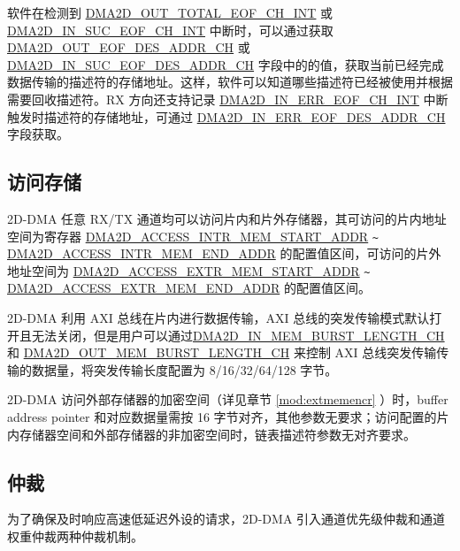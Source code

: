 \documentclass[main\_\_CN.tex]{subfiles}
\begin{document}
软件在检测到 \hyperref[int:DMA2DOUTTOTALEOFINT]{DMA2D\_OUT\_TOTAL\_EOF\_CH\_INT} 或 \hyperref[int:DMA2DINSUCEOFINT]{DMA2D\_IN\_SUC\_EOF\_CH\_INT} 中断时，可以通过获取 \hyperref[fielddesc:DMA2DOUTEOFDESADDRCHN]{DMA2D\_OUT\_EOF\_DES\_ADDR\_CH} 或 \hyperref[fielddesc:DMA2DINSUCEOFDESADDRCHN]{DMA2D\_IN\_SUC\_EOF\_DES\_ADDR\_CH} 字段中的的值，获取当前已经完成数据传输的描述符的存储地址。这样，软件可以知道哪些描述符已经被使用并根据需要回收描述符。RX 方向还支持记录 \hyperref[int:DMA2DINERREOFINT]{DMA2D\_IN\_ERR\_EOF\_CH\_INT} 中断触发时描述符的存储地址，可通过 \hyperref[fielddesc:DMA2DINERREOFDESADDRCHN]{DMA2D\_IN\_ERR\_EOF\_DES\_ADDR\_CH} 字段获取。


\subsection{访问存储}\label{sec:dma2d-access-ram}
2D-DMA 任意 RX/TX 通道均可以访问片内和片外存储器，其可访问的片内地址空间为寄存器 \hyperref[fielddesc:DMA2DACCESSINTRMEMSTARTADDR]{DMA2D\_ACCESS\_INTR\_MEM\_START\_ADDR} \verb+~+ \hyperref[fielddesc:DMA2DACCESSINTRMEMENDADDR]{DMA2D\_ACCESS\_INTR\_MEM\_END\_ADDR} 的配置值区间，可访问的片外地址空间为 \hyperref[fielddesc:DMA2DACCESSEXTRMEMSTARTADDR]{DMA2D\_ACCESS\_EXTR\_MEM\_START\_ADDR} \verb+~+ \hyperref[fielddesc:DMA2DACCESSEXTRMEMENDADDR]{DMA2D\_ACCESS\_EXTR\_MEM\_END\_ADDR} 的配置值区间。

2D-DMA 利用 AXI 总线在片内进行数据传输，AXI 总线的突发传输模式默认打开且无法关闭，但是用户可以通过\hyperref[fielddesc:DMA2DINMEMBURSTLENGTHCHN]{DMA2D\_IN\_MEM\_BURST\_LENGTH\_CH} 和 \hyperref[fielddesc:DMA2DOUTMEMBURSTLENGTHCHN]{DMA2D\_OUT\_MEM\_BURST\_LENGTH\_CH} 来控制 AXI 总线突发传输传输的数据量，将突发传输长度配置为 8/16/32/64/128 字节。

2D-DMA 访问外部存储器的加密空间（详见章节 \ref{mod:extmemencr} \textit{}）时，buffer address pointer 和对应数据量需按 16 字节对齐，其他参数无要求；访问配置的片内存储器空间和外部存储器的非加密空间时，链表描述符参数无对齐要求。


\subsection{仲裁}

为了确保及时响应高速低延迟外设的请求，2D-DMA 引入通道优先级仲裁和通道权重仲裁两种仲裁机制。
\end{document}
